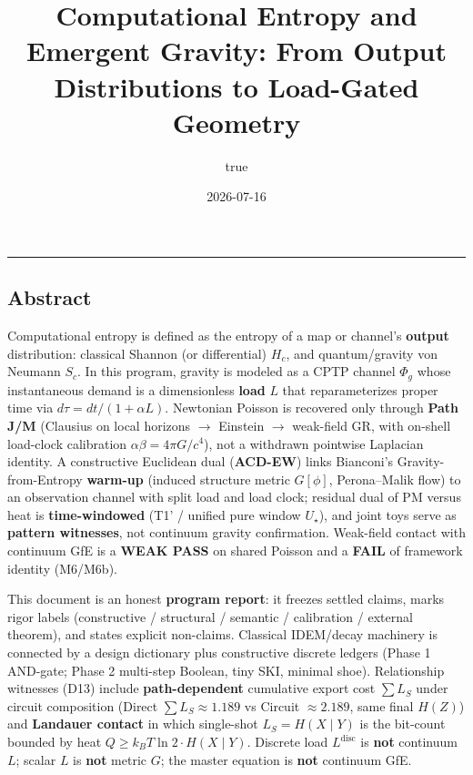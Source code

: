\documentclass[
  11pt,
]{article}
\title{Computational Entropy and Emergent Gravity: From Output Distributions to Load-Gated Geometry}
\author{true}
\date{2026-07-16}
\begin{document}
\maketitle

{
\setcounter{tocdepth}{2}
\tableofcontents
}
\begin{center}\rule{0.5\linewidth}{0.5pt}\end{center}

\subsection{Abstract}\label{abstract}

Computational entropy is defined as the entropy of a map or channel's \textbf{output} distribution: classical Shannon (or differential) \(H_c\), and quantum/gravity von Neumann \(S_c\). In this program, gravity is modeled as a CPTP channel \(\Phi_g\) whose instantaneous demand is a dimensionless \textbf{load} \(L\) that reparameterizes proper time via \(d\tau=dt/(1+\alpha L)\). Newtonian Poisson is recovered only through \textbf{Path J/M} (Clausius on local horizons $\rightarrow$ Einstein $\rightarrow$ weak-field GR, with on-shell load-clock calibration \(\alpha\beta=4\pi G/c^4\)), not a withdrawn pointwise Laplacian identity. A constructive Euclidean dual (\textbf{ACD-EW}) links Bianconi's Gravity-from-Entropy \textbf{warm-up} (induced structure metric \(G[\phi]\), Perona--Malik flow) to an observation channel with split load and load clock; residual dual of PM versus heat is \textbf{time-windowed} (T1' / unified pure window \(U_\star\)), and joint toys serve as \textbf{pattern witnesses}, not continuum gravity confirmation. Weak-field contact with continuum GfE is a \textbf{WEAK PASS} on shared Poisson and a \textbf{FAIL} of framework identity (M6/M6b).

This document is an honest \textbf{program report}: it freezes settled claims, marks rigor labels (constructive / structural / semantic / calibration / external theorem), and states explicit non-claims. Classical IDEM/decay machinery is connected by a design dictionary plus constructive discrete ledgers (Phase 1 AND-gate; Phase 2 multi-step Boolean, tiny SKI, minimal shoe). Relationship witnesses (D13) include \textbf{path-dependent} cumulative export cost \(\sum L_S\) under circuit composition (Direct \(\sum L_S\approx 1.189\) vs Circuit \(\approx 2.189\), same final \(H(Z)\)) and \textbf{Landauer contact} in which single-shot \(L_S=H(X\mid Y)\) is the bit-count bounded by heat \(Q\ge k_B T\ln 2\cdot H(X\mid Y)\). Discrete load \(L^{\mathrm{disc}}\) is \textbf{not} continuum \(L\); scalar \(L\) is \textbf{not} metric \(G\); the master equation is \textbf{not} continuum GfE.
\end{document}
